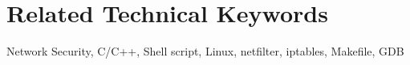 \section{Related Technical Keywords}
Network Security, C/C++, Shell script, Linux, netfilter, iptables, Makefile, GDB
